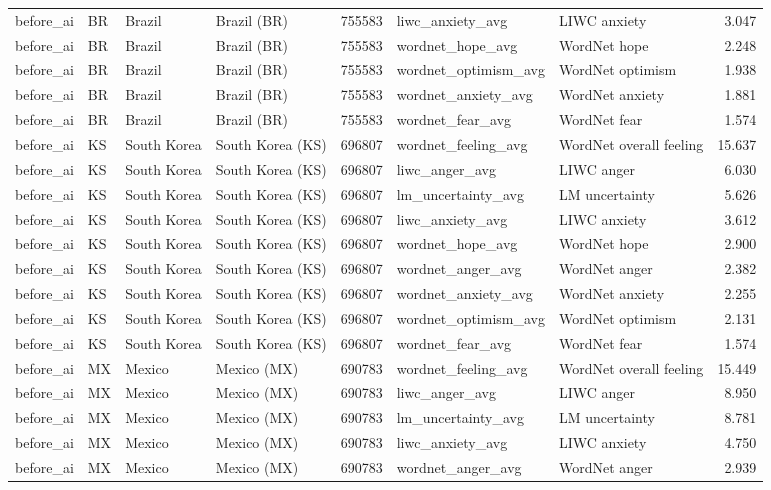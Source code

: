 \begin{tabular}{llllrllr}
before\_ai & BR & Brazil & Brazil (BR) & 755583 & liwc\_anxiety\_avg & LIWC anxiety & 3.047 \\
before\_ai & BR & Brazil & Brazil (BR) & 755583 & wordnet\_hope\_avg & WordNet hope & 2.248 \\
before\_ai & BR & Brazil & Brazil (BR) & 755583 & wordnet\_optimism\_avg & WordNet optimism & 1.938 \\
before\_ai & BR & Brazil & Brazil (BR) & 755583 & wordnet\_anxiety\_avg & WordNet anxiety & 1.881 \\
before\_ai & BR & Brazil & Brazil (BR) & 755583 & wordnet\_fear\_avg & WordNet fear & 1.574 \\
before\_ai & KS & South Korea & South Korea (KS) & 696807 & wordnet\_feeling\_avg & WordNet overall feeling & 15.637 \\
before\_ai & KS & South Korea & South Korea (KS) & 696807 & liwc\_anger\_avg & LIWC anger & 6.030 \\
before\_ai & KS & South Korea & South Korea (KS) & 696807 & lm\_uncertainty\_avg & LM uncertainty & 5.626 \\
before\_ai & KS & South Korea & South Korea (KS) & 696807 & liwc\_anxiety\_avg & LIWC anxiety & 3.612 \\
before\_ai & KS & South Korea & South Korea (KS) & 696807 & wordnet\_hope\_avg & WordNet hope & 2.900 \\
before\_ai & KS & South Korea & South Korea (KS) & 696807 & wordnet\_anger\_avg & WordNet anger & 2.382 \\
before\_ai & KS & South Korea & South Korea (KS) & 696807 & wordnet\_anxiety\_avg & WordNet anxiety & 2.255 \\
before\_ai & KS & South Korea & South Korea (KS) & 696807 & wordnet\_optimism\_avg & WordNet optimism & 2.131 \\
before\_ai & KS & South Korea & South Korea (KS) & 696807 & wordnet\_fear\_avg & WordNet fear & 1.574 \\
before\_ai & MX & Mexico & Mexico (MX) & 690783 & wordnet\_feeling\_avg & WordNet overall feeling & 15.449 \\
before\_ai & MX & Mexico & Mexico (MX) & 690783 & liwc\_anger\_avg & LIWC anger & 8.950 \\
before\_ai & MX & Mexico & Mexico (MX) & 690783 & lm\_uncertainty\_avg & LM uncertainty & 8.781 \\
before\_ai & MX & Mexico & Mexico (MX) & 690783 & liwc\_anxiety\_avg & LIWC anxiety & 4.750 \\
before\_ai & MX & Mexico & Mexico (MX) & 690783 & wordnet\_anger\_avg & WordNet anger & 2.939 \\

\end{tabular}
